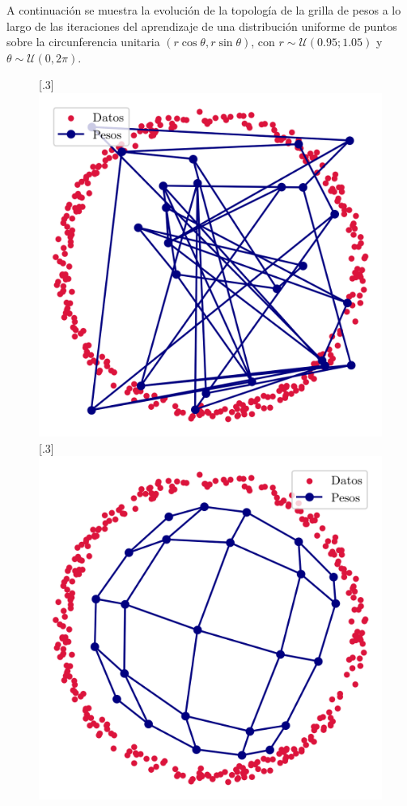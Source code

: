 \documentclass[12pt,a4paper]{article}
\begin{document}
A continuación se muestra la evolución de la topología de la grilla de pesos a lo largo de las iteraciones del aprendizaje de una distribución uniforme de puntos sobre la circunferencia unitaria $(r \cos \theta, r \sin \theta)$, con $r \sim \mathcal{U}(0.95; 1.05)$ y $\theta \sim \mathcal{U}(0, 2\pi)$.
\begin{figure}[H]
  \subcaptionbox*{}[.3\linewidth]{
    \includegraphics[width=\linewidth]{img/kohonen-topología_iteración0.png}
  }
  \subcaptionbox*{}[.3\linewidth]{
    \includegraphics[width=\linewidth]{img/kohonen-topología_iteración10.png}
}
\end{figure}
\end{document}
